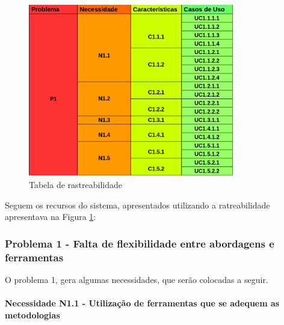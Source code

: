 \begin{figure}[H]
	\centering
	\includegraphics[width=0.8\textwidth]{imgModelagem/tabelaRastreabilidade}
	\caption{Tabela de rastreabilidade}
	\label{img:tabelaRastreabilidade}
\end{figure}

Seguem os recursos do sistema, apresentados utilizando a ratreabilidade apresentava na Figura \ref{img:tabelaRastreabilidade}:

\subsubsection{Problema 1 - Falta de flexibilidade entre abordagens e ferramentas}

O problema 1, gera algumas necessidades, que serão colocadas a seguir.

\paragraph{Necessidade N1.1 - Utilização de ferramentas que se adequem as metodologias}

